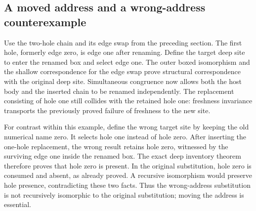 \subsection{A moved address and a wrong-address counterexample}

Use the two-hole chain and its edge swap from the preceding section. The first
hole, formerly edge zero, is edge one after renaming. Define the target deep
site to enter the renamed box and select edge one. The outer boxed isomorphism
and the shallow correspondence for the edge swap prove structural
correspondence with the original deep site.
Simultaneous congruence now allows both the host body and the inserted chain to
be renamed independently. The replacement consisting of hole one still
collides with the retained hole one: freshness invariance transports the
previously proved failure of freshness to the new site.

For contrast within this example, define the wrong target site by keeping the
old numerical name zero. It selects hole one instead of hole zero. After
inserting the one-hole replacement, the wrong result retains hole zero,
witnessed by the surviving edge one inside the renamed box. The exact deep
inventory theorem therefore proves that hole zero is present. In the original
substitution, hole zero is consumed and absent, as already proved. A recursive
isomorphism would preserve hole presence, contradicting these two facts.
Thus the wrong-address substitution is not recursively isomorphic to the
original substitution; moving the address is essential.
